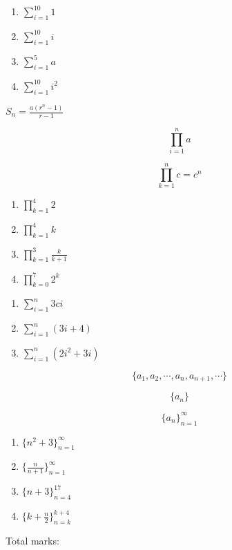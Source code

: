 \documentclass[twocolumn]{article}
\newcounter{marks}
\begin{document}
\begin{enumerate}
    \item $ \sum_{i=1}^{10} 1 $

    \item $ \sum_{i=1}^{10} i $

    \item $ \sum_{i=1}^{5} a $

    \item $ \sum_{i=1}^{10} i^2 $
\end{enumerate}




$ S_n = \frac{a(r^n - 1)}{r-1}$

$$ \prod_{i=1}^{n} a $$

$$ \prod_{k=1}^{n} c = c^n $$

\begin{enumerate}
    \item $ \prod_{k=1}^{4} 2 $

    \item $ \prod_{k=1}^{4} k $
    
    \item $ \prod_{k=1}^{3} \frac{k}{k+1} $

    \item $ \prod_{k=0}^{7} 2^k $
\end{enumerate}


\begin{enumerate}
    \item $ \sum_{i=1}^{n} 3ci $

    \item $ \sum_{i=1}^{n} (3i + 4) $

    \item $ \sum_{i=1}^{n} (2i^2 + 3i) $
\end{enumerate}

$$ \{a_1, a_2, \cdots, a_n, a_{n+1}, \cdots \} $$

$$ \{ a_n \} $$

$$ \{ a_n \}_{n=1}^{\infty} $$

\begin{enumerate}
    \item $ \{ n^2 + 3 \}_{n=1}^{\infty} $
    \item $ \{ \frac{n}{n+1} \}_{n=1}^{\infty} $
    \item $ \{ n + 3 \}_{n=4}^{17} $
    \item $ \{ k + \frac{n}{2} \}_{n=k}^{k+4} $
\end{enumerate}
\fi
\fi
\clearpage
Total marks: 
\end{document}
